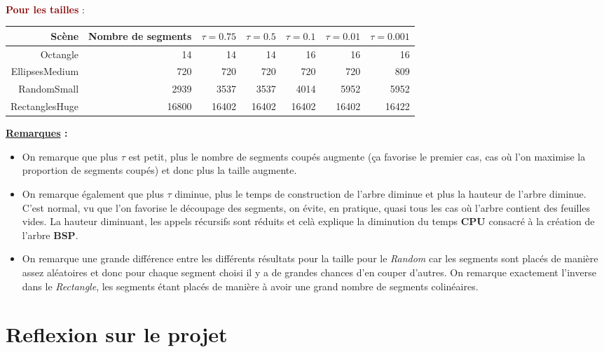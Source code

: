 \documentclass{article}
\newcommand{\dred}[1]{\textcolor{darkred}{\textbf{#1}}}
\begin{document}
$ $\\
\noindent \dred{Pour les tailles} :
\begin{center}
	\begin{tabular}{|*{7}{r|}}
	\hline
	Scène & Nombre de segments & $\tau = 0.75$ & $\tau = 0.5$ & $\tau = 0.1$ & $\tau = 0.01$ & $\tau = 0.001$ \\
	\hline
	Octangle & 14 & 14 & 14 & 16 & 16 & 16 \\
	\hline
	EllipsesMedium & 720 & 720 & 720 & 720 & 720 & 809 \\
	\hline
	RandomSmall & 2939 & 3537 & 3537 & 4014 & 5952 & 5952 \\
	\hline
	RectanglesHuge & 16800 & 16402 & 16402 & 16402 & 16402 & 16422 \\
	\hline
	\end{tabular}
\end{center}
\newpage
\noindent\textbf{\underline{Remarques} : } \\
\begin{itemize}
\item On remarque que plus $\tau$ est petit, plus le nombre de segments coupés augmente (ça favorise le premier cas, cas où l'on maximise la proportion de segments coupés) et 
donc plus la taille augmente.
\item On remarque également que plus $\tau$ diminue, plus le temps de construction de l'arbre diminue et plus la hauteur de l'arbre diminue. C'est normal, vu que l'on favorise le
découpage des segments, on évite, en pratique, quasi tous les cas où l'arbre contient des feuilles vides. La hauteur diminuant, les appels récursifs sont réduits et celà explique la
diminution du temps \textbf{CPU} consacré à la création de l'arbre \textbf{BSP}.
\item On remarque une grande différence entre les différents résultats pour la taille pour le \textit{Random} car les segments sont placés de manière assez aléatoires et donc 
pour chaque segment choisi il y a de grandes chances d'en couper d'autres. On remarque exactement l'inverse dans le \textit{Rectangle}, les segments étant placés de manière à 
avoir une grand nombre de segments colinéaires.\\
\end{itemize}

\section{Reflexion sur le projet}
\end{document}
